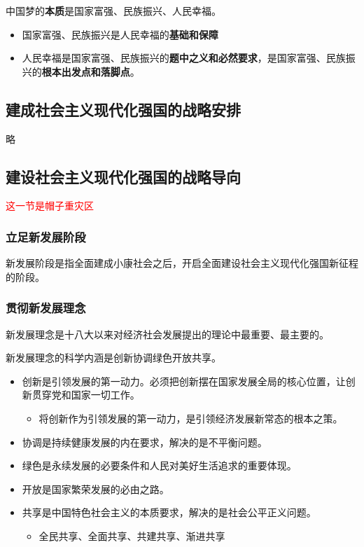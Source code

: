 \documentclass[12pt, a4paper, oneside]{ctexart}
\begin{document}
中国梦的\textbf{本质}是国家富强、民族振兴、人民幸福。

\begin{itemize}
  \item 国家富强、民族振兴是人民幸福的\textbf{基础和保障}
  \item 人民幸福是国家富强、民族振兴的\textbf{题中之义和必然要求}，是国家富强、民族振兴的\textbf{根本出发点和落脚点}。
\end{itemize}

\subsection{建成社会主义现代化强国的战略安排}

略

\subsection{建设社会主义现代化强国的战略导向}

\textcolor{red}{这一节是帽子重灾区}

\vspace*{10pt}

\subsubsection{立足新发展阶段}

新发展阶段是指全面建成小康社会之后，开启全面建设社会主义现代化强国新征程的阶段。

\subsubsection{贯彻新发展理念}

新发展理念是十八大以来对经济社会发展提出的理论中最重要、最主要的。

新发展理念的科学内涵是创新协调绿色开放共享。

\begin{itemize}
  \item 创新是引领发展的第一动力。必须把创新摆在国家发展全局的核心位置，让创新贯穿党和国家一切工作。
  \begin{itemize}
    \item 将创新作为引领发展的第一动力，是引领经济发展新常态的根本之策。
  \end{itemize}
  \item 协调是持续健康发展的内在要求，解决的是不平衡问题。
  \item 绿色是永续发展的必要条件和人民对美好生活追求的重要体现。
  \item 开放是国家繁荣发展的必由之路。
  \item 共享是中国特色社会主义的本质要求，解决的是社会公平正义问题。
  \begin{itemize}
    \item 全民共享、全面共享、共建共享、渐进共享
  \end{itemize}
\end{itemize}
\end{document}
